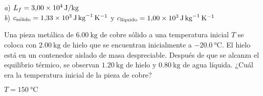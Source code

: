 \begin{Answer}
	\begin{minipage}[t]{.4\textwidth}
    \textit{a}) $ L_f = \SI{3.00E4}{\joule/\kilogram}$\\ \textit{b}) $c_\text{sólido}=\SI{1.33E3}{\joule.\kilogram^{-1}.\kelvin^{-1}}$ y $c_\text{líquido}=\SI{1.00E3}{\joule.\kilogram^{-1}.\kelvin^{-1}}$
  \end{minipage}
\end{Answer}
%
\begin{center}
  \end{center}
%
\begin{Exercise}
    {}{}
  Una pieza metálica de $\SI{6.00}{\kilogram}$ de cobre sólido a una temperatura inicial $T$ se coloca con $\SI{2.00}{\kilogram}$ de hielo que se encuentran inicialmente a $\SI{-20.0}{\celsius}$. El hielo está en un contenedor aislado de masa despreciable. Después de que se alcanza el equilibrio térmico, se observan $\SI{1.20}{\kilogram}$ de hielo y $\SI{0.80}{\kilogram}$ de agua líquida. ¿Cuál era la temperatura inicial de la pieza de cobre?
\end{Exercise}
\begin{Answer}
  $T=\SI{150}{\celsius}$
\end{Answer}
